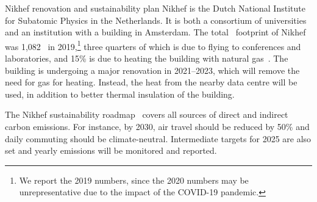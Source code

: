 \documentclass[../SustainableHEP.tex]{subfiles}
\begin{document}

\begin{bestpractice}{Nikhef renovation and sustainability plan}%
    Nikhef is the Dutch National Institute for Subatomic Physics in the Netherlands. It is both a consortium of universities and an institution with a building in Amsterdam. The total \tCdOe\ footprint of Nikhef was 1,082 \tCdOe\ in 2019,\footnote{We report the 2019 numbers, since the 2020 numbers may be unrepresentative due to the impact of the COVID-19 pandemic.} three quarters of which is due to flying to conferences and laboratories, and 15\% is due to heating the building with natural gas~\cite{Nikhef}. The building is undergoing a major renovation in 2021--2023, which will remove the need for gas for heating. Instead, the heat from the nearby data centre will be used, in addition to better thermal insulation of the building.

    The Nikhef sustainability roadmap~\cite{Nikhef} covers all sources of direct and indirect carbon emissions. For instance, by 2030, air travel should be reduced by 50\% and daily commuting should be climate-neutral.  Intermediate targets for 2025 are also set and yearly emissions will be monitored and reported.
\end{bestpractice}



\pagebreak
\end{document}
